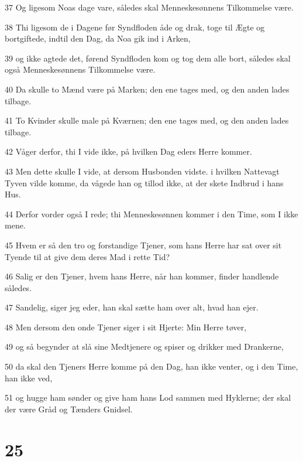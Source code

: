 \par 37 Og ligesom Noas dage vare, således skal Menneskesønnens Tilkommelse være.
\par 38 Thi ligesom de i Dagene før Syndfloden åde og drak, toge til Ægte og bortgiftede, indtil den Dag, da Noa gik ind i Arken,
\par 39 og ikke agtede det, førend Syndfloden kom og tog dem alle bort, således skal også Menneskesønnens Tilkommelse være.
\par 40 Da skulle to Mænd være på Marken; den ene tages med, og den anden lades tilbage.
\par 41 To Kvinder skulle male på Kværnen; den ene tages med, og den anden lades tilbage.
\par 42 Våger derfor, thi I vide ikke, på hvilken Dag eders Herre kommer.
\par 43 Men dette skulle I vide, at dersom Husbonden vidste. i hvilken Nattevagt Tyven vilde komme, da vågede han og tillod ikke, at der skete Indbrud i hans Hus.
\par 44 Derfor vorder også I rede; thi Menneskesønnen kommer i den Time, som I ikke mene.
\par 45 Hvem er så den tro og forstandige Tjener, som hans Herre har sat over sit Tyende til at give dem deres Mad i rette Tid?
\par 46 Salig er den Tjener, hvem hans Herre, når han kommer, finder handlende således.
\par 47 Sandelig, siger jeg eder, han skal sætte ham over alt, hvad han ejer.
\par 48 Men dersom den onde Tjener siger i sit Hjerte: Min Herre tøver,
\par 49 og så begynder at slå sine Medtjenere og spiser og drikker med Drankerne,
\par 50 da skal den Tjeners Herre komme på den Dag, han ikke venter, og i den Time, han ikke ved,
\par 51 og hugge ham sønder og give ham hans Lod sammen med Hyklerne; der skal der være Gråd og Tænders Gnidsel.

\chapter{25}

